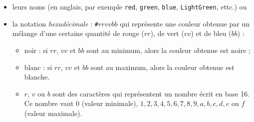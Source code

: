 \documentclass[a4paper,17pt]{extarticle}
\providecommand{\tightlist}{%
      \setlength{\itemsep}{0pt}\setlength{\parskip}{0pt}}
\begin{document}
\begin{itemize}
\tightlist
\item
  leurs noms (en anglais, par exemple \texttt{red}, \texttt{green},
  \texttt{blue}, \texttt{LightGreen}, ettc.) ou
\item
  la notation \emph{hexadécimale} : \texttt{\#}\(rrvvbb\) qui représente
  une couleur obtenue par un mélange d'une certaine quantité de rouge
  (\(rr\)), de vert (\(vv\)) et de bleu (\(bb\)) :

  \begin{itemize}
  \tightlist
  \item
    noir : si \(rr\), \(vv\) et \(bb\) sont au minimum, alors la couleur
    obtenue est noire ;
  \item
    blanc : si \(rr\), \(vv\) et \(bb\) sont au maximum, alors la
    couleur obtenue est blanche.
  \item
    \(r\), \(v\) ou \(b\) sont des caractères qui représentent un nombre
    écrit en base 16. Ce nombre vaut \(0\) (valeur minimale),
    \(1,2,3,4,5,6,7,8,9,a,b,c,d,e\) ou \(f\) (valeur maximale).
  \end{itemize}
\end{itemize}
\end{document}
